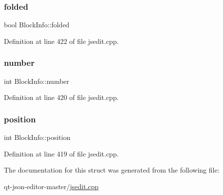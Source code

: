 \subsubsection{\texorpdfstring{folded}{folded}}
{\footnotesize\ttfamily bool Block\+Info\+::folded}



Definition at line 422 of file jsedit.\+cpp.

\mbox{\label{struct_block_info_a7f39cc445f8a30a859859f49e59640ee}} 
\subsubsection{\texorpdfstring{number}{number}}
{\footnotesize\ttfamily int Block\+Info\+::number}



Definition at line 420 of file jsedit.\+cpp.

\mbox{\label{struct_block_info_a6333e999c5d9f3e8882776e66eb087c0}} 
\subsubsection{\texorpdfstring{position}{position}}
{\footnotesize\ttfamily int Block\+Info\+::position}



Definition at line 419 of file jsedit.\+cpp.



The documentation for this struct was generated from the following file\+:\begin{DoxyCompactItemize}
\item 
qt-\/json-\/editor-\/master/\hyperlink{jsedit_8cpp}{jsedit.\+cpp}\end{DoxyCompactItemize}

